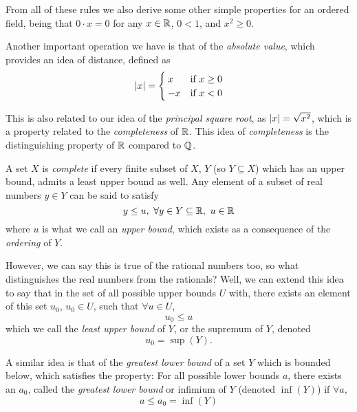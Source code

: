 \documentclass[12pt]{article}
\theoremstyle{definition}
\begin{document}
    From all of these rules we also derive some other simple properties for an ordered field, being that $0 \cdot x = 0$ for any $x \in \R$, $0 < 1$, and $x^{2} \geq 0$.

    Another important operation we have is that of the \textit{absolute value}, which provides an idea of distance, defined as 
    \begin{equation*}
        \left|x\right| = \begin{cases}
            x & \mbox{if} ~ x \geq 0 \\
            -x & \mbox{if} ~ x < 0
        \end{cases}
    \end{equation*}

    \begin{remark}
        This is also related to our idea of the \textit{principal square root}, as $\left|x\right| = \sqrt{x^{2}}$, which is a property related to the \textit{completeness} of $\R$. This idea of \textit{completeness} is the distinguishing property of $\R$ compared to $\mathbb{Q}$. 
    \end{remark}

    \newpage

    A set $X$ is \textit{complete} if every finite subset of $X$, $Y$ (so $Y \subseteq X$) which has an upper bound, admits a least upper bound as well. Any element of a subset of real numbers $y \in Y$ can be said to satisfy
    \begin{equation*}
        y \leq u, ~ \forall y \in Y \subseteq \R, ~ u \in \R 
    \end{equation*}
    where $u$ is what we call an \textit{upper bound}, which exists as a consequence of the \textit{ordering} of $Y$.
    
    However, we can say this is true of the rational numbers too, so what distinguishes the real numbers from the rationals?
    Well, we can extend this idea to say that in the set of all possible upper bounds $U$ with, there exists an element of this set $u_{0}$, $u_{0} \in U$, such that $\forall u \in U$, 
    \begin{equation*}
        u_{0} \leq u
    \end{equation*}
    which we call the \textit{least upper bound} of $Y$, or the supremum of $Y$, denoted
    \begin{equation*}
        u_{0} = \sup (Y).
    \end{equation*}
    
    A similar idea is that of the \textit{greatest lower bound} of a set $Y$ which is bounded below, which satisfies the property:
    For all possible lower bounds $a$, there exists an $a_{0}$, called the \textit{greatest lower bound} or infimium of $Y$ (denoted $\inf{(Y)}$) if $\forall a$, 
    \begin{equation*}
        a \leq a_{0} = \inf{(Y)}
    \end{equation*}
\end{document}
